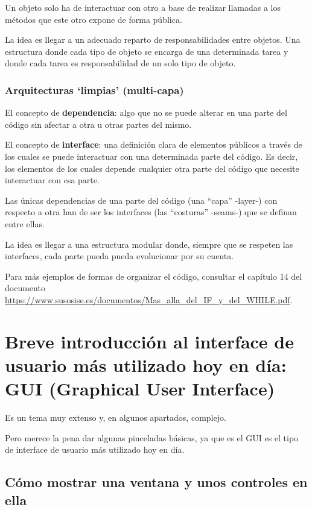 \documentclass[spanish,12pt,a4paper,final,oneside]{book}
\begin{document}
Un objeto solo ha de interactuar con otro a base de realizar llamadas a los métodos que este otro expone de forma pública.

La idea es llegar a un adecuado reparto de responsabilidades entre objetos. Una estructura donde cada tipo de objeto se encarga de una determinada tarea y donde cada tarea es responsabilidad de un solo tipo de objeto.

\subsection{Arquitecturas `limpias' (multi-capa)}

El concepto de \textbf{dependencia}: algo que no se puede alterar en una parte del código sin afectar a otra u otras partes del mismo.

El concepto de \textbf{interface}: una definición clara de elementos públicos a través de los cuales se puede interactuar con una determinada parte del código. Es decir, los elementos de los cuales depende cualquier otra parte del código que necesite interactuar con esa parte.

Las únicas dependencias de una parte del código (una ``capa'' -layer-) con respecto a otra han de ser los interfaces (las ``costuras'' -seams-) que se definan entre ellas.

La idea es llegar a una estructura modular donde, siempre que se respeten las interfaces, cada parte pueda pueda evolucionar por su cuenta.
 




\vfill
Para más ejemplos de formas de organizar el código, consultar el capítulo 14 del documento \url{https://www.susosise.es/documentos/Mas_alla_del_IF_y_del_WHILE.pdf}.


\chapter{Breve introducción al interface de usuario más utilizado hoy en día: \\GUI (Graphical User Interface)}

Es un tema muy extenso y, en algunos apartados, complejo.

Pero merece la pena dar algunas pinceladas básicas, ya que es el GUI es el tipo de interface de usuario más utilizado hoy en día.

\section{Cómo mostrar una ventana y unos controles en ella}
\end{document}
